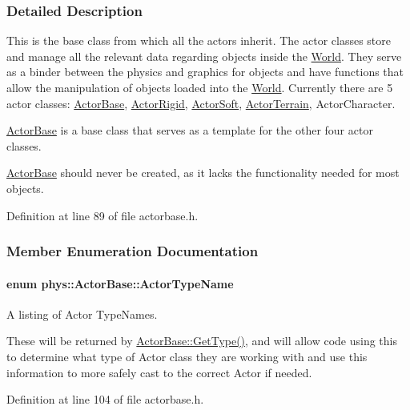 \subsubsection{Detailed Description}
This is the base class from which all the actors inherit. The actor classes store and manage all the relevant data regarding objects inside the \hyperlink{classphys_1_1World}{World}. They serve as a binder between the physics and graphics for objects and have functions that allow the manipulation of objects loaded into the \hyperlink{classphys_1_1World}{World}. Currently there are 5 actor classes: \hyperlink{classphys_1_1ActorBase}{ActorBase}, \hyperlink{classphys_1_1ActorRigid}{ActorRigid}, \hyperlink{classphys_1_1ActorSoft}{ActorSoft}, \hyperlink{classphys_1_1ActorTerrain}{ActorTerrain}, ActorCharacter. \par
 \hyperlink{classphys_1_1ActorBase}{ActorBase} is a base class that serves as a template for the other four actor classes. \par
 \hyperlink{classphys_1_1ActorBase}{ActorBase} should never be created, as it lacks the functionality needed for most objects. 

Definition at line 89 of file actorbase.h.



\subsubsection{Member Enumeration Documentation}
\hypertarget{classphys_1_1ActorBase_aff3a7c464e8ce82576073f8f891434b7}{
\paragraph[{ActorTypeName}]{\setlength{\rightskip}{0pt plus 5cm}enum {\bf phys::ActorBase::ActorTypeName}}\hfill}
\label{classphys_1_1ActorBase_aff3a7c464e8ce82576073f8f891434b7}


A listing of Actor TypeNames. 

These will be returned by \hyperlink{classphys_1_1ActorBase_ac631b0572fbcac6ac6dee3b0a8704c8e}{ActorBase::GetType()}, and will allow code using this to determine what type of Actor class they are working with and use this information to more safely cast to the correct Actor if needed. 

Definition at line 104 of file actorbase.h.



